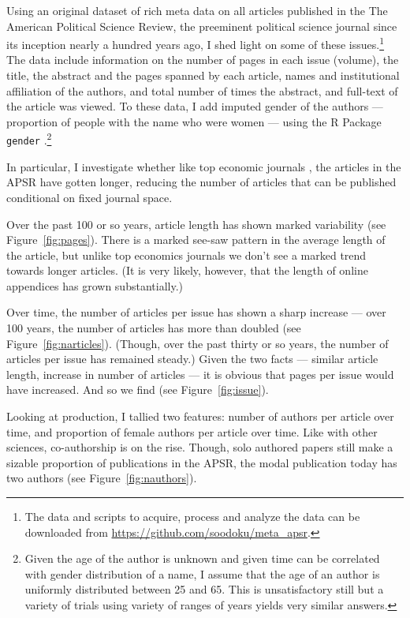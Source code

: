 \documentclass[12pt]{article}
\begin{document}
Using an original dataset of rich meta data on all articles published in the The American Political Science Review, the preeminent political science journal since its inception nearly a hundred years ago, I shed light on some of these issues.\footnote{The data and scripts to acquire, process and analyze the data can be downloaded from \href{https://github.com/soodoku/meta_apsr}{https://github.com/soodoku/meta\_apsr}.} The data include information on the number of pages in each issue (volume), the title, the abstract and the pages spanned by each article, names and institutional affiliation of the authors, and total number of times the abstract, and full-text of the article was viewed. To these data, I add imputed gender of the authors --- proportion of people with the name who were women --- using the R Package {\tt gender} \citet{lincoln2015}.\footnote{Given the age of the author is unknown and given time can be correlated with gender distribution of a name, I assume that the age of an author is uniformly distributed between 25 and 65. This is unsatisfactory still but a variety of trials using variety of ranges of years yields very similar answers.}

In particular, I investigate whether like top economic journals \citep{card2013nine, card2014page}, the articles in the APSR have gotten longer, reducing the number of articles that can be published conditional on fixed journal space.

Over the past 100 or so years, article length has shown marked variability (see Figure~\ref{fig:pages}). There is a marked see-saw pattern in the average length of the article, but unlike top economics journals we don't see a marked trend towards longer articles. (It is very likely, however, that the length of online appendices has grown substantially.)

Over time, the number of articles per issue has shown a sharp increase --- over 100 years, the number of articles has more than doubled (see Figure~\ref{fig:narticles}). (Though, over the past thirty or so years, the number of articles per issue has remained steady.) Given the two facts --- similar article length, increase in number of articles --- it is obvious that pages per issue would have increased. And so we find (see Figure~\ref{fig:issue}). 

Looking at production, I tallied two features: number of authors per article over time, and proportion of female authors per article over time. Like with other sciences, co-authorship is on the rise. Though, solo authored papers still make a sizable proportion of publications in the APSR, the modal publication today has two authors (see Figure~\ref{fig:nauthors}).
\end{document}
